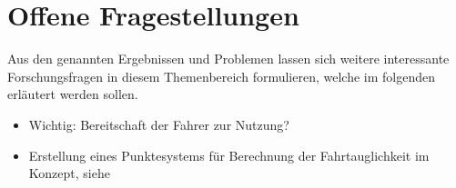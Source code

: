 \section{Offene Fragestellungen}
\label{openChallenges}
Aus den genannten Ergebnissen und Problemen lassen sich weitere interessante Forschungsfragen in diesem Themenbereich formulieren, welche im folgenden erläutert werden sollen.

\begin{itemize}
	\item Wichtig: Bereitschaft der Fahrer zur Nutzung?
	\item Erstellung eines Punktesystems für Berechnung der Fahrtauglichkeit im Konzept, siehe \cite{drivesafe}
\end{itemize}
